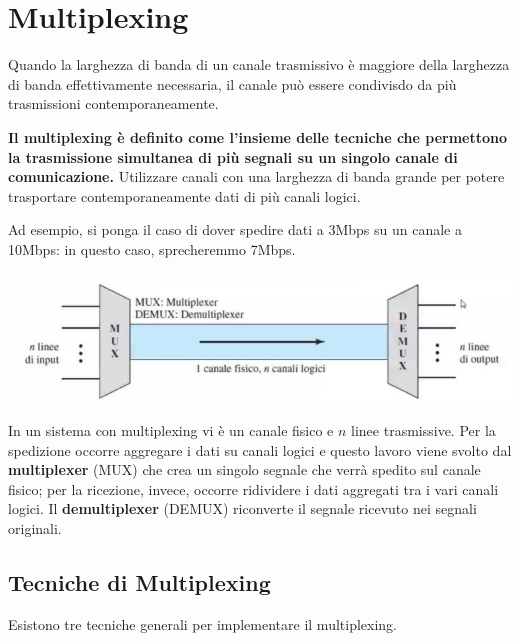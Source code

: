 \section{Multiplexing}
    Quando la larghezza di banda di un canale trasmissivo è maggiore della larghezza di banda effettivamente necessaria, il canale può essere condivisdo da più trasmissioni contemporaneamente.
    
    \vspace{3mm}
    
    \textbf{Il multiplexing è definito come l'insieme delle tecniche che permettono la trasmissione simultanea di più segnali su un singolo canale di comunicazione.} Utilizzare canali con una larghezza di banda grande per potere trasportare contemporaneamente dati di più canali logici.
    
    \vspace{3mm}
    
    Ad esempio, si ponga il caso di dover spedire dati a 3Mbps su un canale a 10Mbps: in questo caso, sprecheremmo 7Mbps.
    
    \begin{center}
        \includegraphics[scale=0.6]{images/Multiplexing.png}
    \end{center}
    
    In un sistema con multiplexing vi è un canale fisico e $n$ linee trasmissive. Per la spedizione occorre aggregare i dati su canali logici e questo lavoro viene svolto dal \textbf{multiplexer} (MUX) che crea un singolo segnale che verrà spedito sul canale fisico; per la ricezione, invece, occorre ridividere i dati aggregati tra i vari canali logici. Il \textbf{demultiplexer} (DEMUX) riconverte il segnale ricevuto nei segnali originali.
    
    \subsection{Tecniche di Multiplexing}
        Esistono tre tecniche generali per implementare il multiplexing.
    
